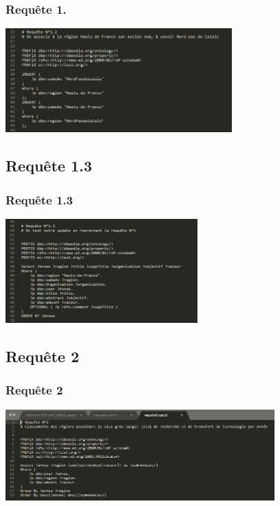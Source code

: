 \documentclass[12pt]{beamer}
\begin{document}
			\begin{frame}
				
				\frametitle{Requête 1.}
				
				\centering\includegraphics[height=4cm]{picture/requete12.jpg}
					
			\end{frame}	
			

		\subsection{Requête 1.3}
		
			\begin{frame}
				
				\frametitle{Requête 1.3}
				
				\centering\includegraphics[height=4cm]{picture/requete13.jpg}
					
			\end{frame}	
			
							
		\subsection{Requête 2}
		
			\begin{frame}
				
				\frametitle{Requête 2}
				
				\centering\includegraphics[height=3.5cm]{picture/requete2.jpg}
								
			\end{frame}	
			
\end{document}
